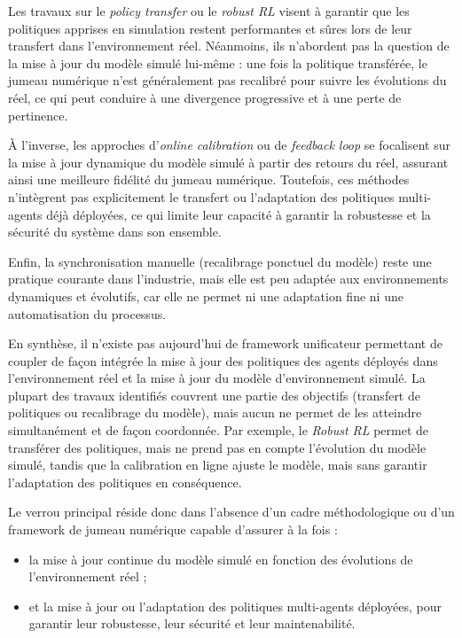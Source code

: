 Les travaux sur le \textit{policy transfer} ou le \textit{robust RL} visent à garantir que les politiques apprises en simulation restent performantes et sûres lors de leur transfert dans l'environnement réel. Néanmoins, ils n'abordent pas la question de la mise à jour du modèle simulé lui-même : une fois la politique transférée, le jumeau numérique n'est généralement pas recalibré pour suivre les évolutions du réel, ce qui peut conduire à une divergence progressive et à une perte de pertinence.

À l'inverse, les approches d'\textit{online calibration} ou de \textit{feedback loop} se focalisent sur la mise à jour dynamique du modèle simulé à partir des retours du réel, assurant ainsi une meilleure fidélité du jumeau numérique. Toutefois, ces méthodes n'intègrent pas explicitement le transfert ou l'adaptation des politiques multi-agents déjà déployées, ce qui limite leur capacité à garantir la robustesse et la sécurité du système dans son ensemble.

Enfin, la synchronisation manuelle (recalibrage ponctuel du modèle) reste une pratique courante dans l'industrie, mais elle est peu adaptée aux environnements dynamiques et évolutifs, car elle ne permet ni une adaptation fine ni une automatisation du processus.

En synthèse, il n'existe pas aujourd'hui de framework unificateur permettant de coupler de façon intégrée la mise à jour des politiques des agents déployés dans l'environnement réel et la mise à jour du modèle d'environnement simulé. La plupart des travaux identifiés couvrent une partie des objectifs (transfert de politiques ou recalibrage du modèle), mais aucun ne permet de les atteindre simultanément et de façon coordonnée. Par exemple, le \textit{Robust RL} permet de transférer des politiques, mais ne prend pas en compte l'évolution du modèle simulé, tandis que la calibration en ligne ajuste le modèle, mais sans garantir l'adaptation des politiques en conséquence.

Le verrou principal réside donc dans l'absence d'un cadre méthodologique ou d'un framework de jumeau numérique capable d'assurer à la fois :
\begin{itemize}
  \item la mise à jour continue du modèle simulé en fonction des évolutions de l'environnement réel ;
  \item et la mise à jour ou l'adaptation des politiques multi-agents déployées, pour garantir leur robustesse, leur sécurité et leur maintenabilité.
\end{itemize}

